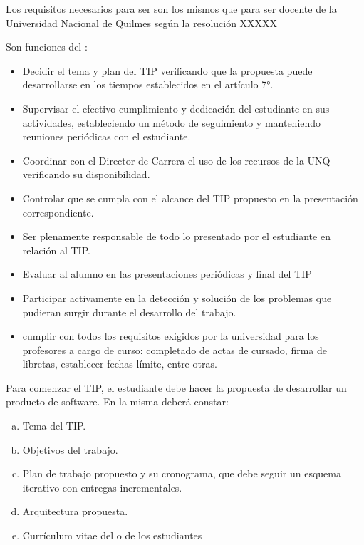 \articulo Los requisitos necesarios para ser \profesorTIP{} son los mismos que para ser docente
de la Universidad Nacional de Quilmes según la resolución XXXXX %

\articulo Son funciones del \profesorTIP{}:
\begin{itemize}
 \item Decidir el tema y plan del TIP verificando que la
 propuesta puede desarrollarse en los tiempos establecidos en el
 artículo 7°.
 \item Supervisar el efectivo cumplimiento y dedicación del estudiante en
 sus actividades, estableciendo un método de seguimiento y
 manteniendo reuniones periódicas con el estudiante.
 \item Coordinar con el Director de Carrera el uso de los recursos de la
 UNQ verificando su disponibilidad.
 \item Controlar que se cumpla con el alcance del TIP propuesto en la
 presentación correspondiente.
 \item Ser plenamente responsable de todo lo presentado por el
 estudiante en relación al TIP.
 \item Evaluar al alumno en las presentaciones periódicas y final del TIP
 \item Participar activamente en la detección y solución de los problemas
 que pudieran surgir durante el desarrollo del trabajo.
 \item cumplir con todos los requisitos exigidos por la universidad para los profesores a cargo de curso:
 completado de actas de cursado, firma de libretas, establecer fechas límite, entre otras.
\end{itemize}



\articulo Para comenzar el TIP, el estudiante debe hacer la propuesta de desarrollar un producto de
software. En la misma deberá constar:

\begin{enumerate}[a.]
\item Tema del TIP.
\item Objetivos del trabajo.
\item Plan de trabajo propuesto y su cronograma, que debe seguir un esquema iterativo con entregas
incrementales.
\item Arquitectura propuesta.
\item Currículum vitae del o de los estudiantes
\end{enumerate}

